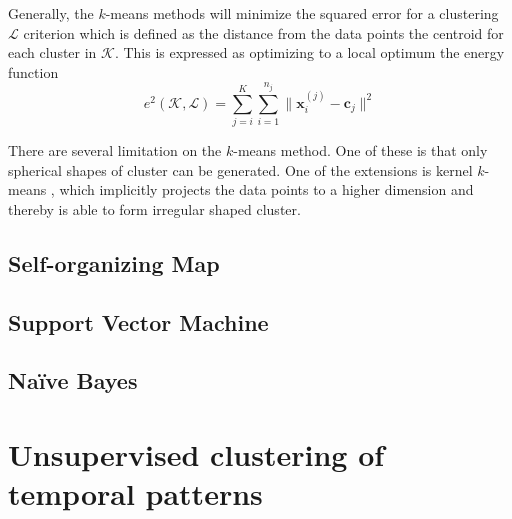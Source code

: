 Generally, the $k$-means methods will minimize the squared error for a
clustering $\mathcal{L}$ criterion which is defined as the distance from the
data points the centroid for each cluster in $\mathcal{K}$. This is expressed
as optimizing to a local optimum the energy function
\begin{equation} \label{eq:k-means energy}
e^2(\mathcal{K},\mathcal{L}) =
\sum_{j=i}^{K}\sum_{i=1}^{n_j}\|\mathbf{x}_i^{(j)} -
\mathbf{c}_j\|^2
\end{equation}

There are several limitation on the $k$-means method. One of these is that
only spherical shapes of cluster can be generated. One of the extensions is
kernel $k$-means \cite{scholkopf1998nonlinear}, which implicitly projects the
data points to a higher dimension and thereby is able to form irregular shaped
cluster.

\subsection{Self-organizing Map}

\subsection{Support Vector Machine}

\subsection{Na\"{i}ve Bayes}

\section{Unsupervised clustering of temporal patterns}